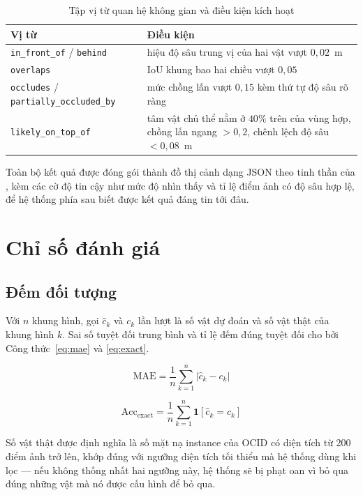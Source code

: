 \begin{table}[H]
\centering
\caption{Tập vị từ quan hệ không gian và điều kiện kích hoạt}
\label{tab:vitu}
\small
\begin{tabularx}{\textwidth}{l X}
\toprule
\textbf{Vị từ} & \textbf{Điều kiện} \\
\midrule
\texttt{in\_front\_of} / \texttt{behind}
  & hiệu độ sâu trung vị của hai vật vượt $0{,}02$~m \\
\texttt{overlaps}
  & IoU khung bao hai chiều vượt $0{,}05$ \\
\texttt{occludes} / \texttt{partially\_occluded\_by}
  & mức chồng lấn vượt $0{,}15$ kèm thứ tự độ sâu rõ ràng \\
\texttt{likely\_on\_top\_of}
  & tâm vật chủ thể nằm ở $40\%$ trên của vùng hợp, chồng lấn ngang $> 0{,}2$,
    chênh lệch độ sâu $< 0{,}08$~m \\
\bottomrule
\end{tabularx}
\end{table}

Toàn bộ kết quả được đóng gói thành đồ thị cảnh dạng JSON theo tinh thần của
\cite{johnson2015scenegraph}, kèm các cờ độ tin cậy như mức độ nhìn thấy và tỉ lệ điểm ảnh có độ
sâu hợp lệ, để hệ thống phía sau biết được kết quả đáng tin tới đâu.

\section{Chỉ số đánh giá}

\subsection{Đếm đối tượng}

Với $n$ khung hình, gọi $\hat{c}_k$ và $c_k$ lần lượt là số vật dự đoán và số vật thật của khung
hình $k$. Sai số tuyệt đối trung bình và tỉ lệ đếm đúng tuyệt đối cho bởi
Công thức~\eqref{eq:mae} và \eqref{eq:exact}.

\begin{equation}
\label{eq:mae}
\mathrm{MAE} = \frac{1}{n}\sum_{k=1}^{n} \left| \hat{c}_k - c_k \right|
\end{equation}

\begin{equation}
\label{eq:exact}
\mathrm{Acc}_{\text{exact}} = \frac{1}{n}\sum_{k=1}^{n} \mathbf{1}\!\left[\hat{c}_k = c_k\right]
\end{equation}

Số vật thật được định nghĩa là số mặt nạ instance của OCID có diện tích từ 200 điểm ảnh trở lên,
khớp đúng với ngưỡng diện tích tối thiểu mà hệ thống dùng khi lọc --- nếu không thống nhất hai
ngưỡng này, hệ thống sẽ bị phạt oan vì bỏ qua đúng những vật mà nó được cấu hình để bỏ qua.

